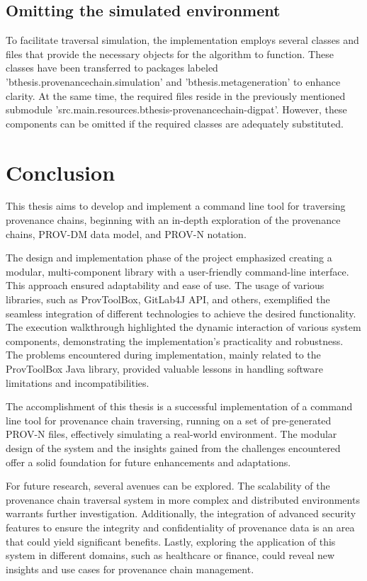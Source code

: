 \documentclass[
  digital,     %
  oneside,     %
  nosansbold,  %
  nocolorbold, %
  lof,         %
  lot,         %
]{fithesis4}
\begin{document}
\section{Omitting the simulated environment}
To facilitate traversal simulation, the implementation employs several classes and files that provide the necessary objects for the algorithm to function. These classes have been transferred to packages labeled 'bthesis.provenancechain.simulation' and 'bthesis.metageneration' to enhance clarity. At the same time, the required files reside in the previously mentioned submodule 'src.main.resources.bthesis-provenancechain-digpat'. However, these components can be omitted if the required classes are adequately substituted.
\shorthandon{-}


\chapter*{Conclusion}
\shorthandoff{-}
This thesis aims to develop and implement a command line tool for traversing provenance chains, beginning with an in-depth exploration of the provenance chains, PROV-DM data model, and PROV-N notation.

The design and implementation phase of the project emphasized creating a modular, multi-component library with a user-friendly command-line interface. This approach ensured adaptability and ease of use. The usage of various libraries, such as ProvToolBox, GitLab4J API, and others, exemplified the seamless integration of different technologies to achieve the desired functionality. The execution walkthrough highlighted the dynamic interaction of various system components, demonstrating the implementation's practicality and robustness. The problems encountered during implementation, mainly related to the ProvToolBox Java library, provided valuable lessons in handling software limitations and incompatibilities.

The accomplishment of this thesis is a successful implementation of a command line tool for provenance chain traversing, running on a set of pre-generated PROV-N files, effectively simulating a real-world environment. The modular design of the system and the insights gained from the challenges encountered offer a solid foundation for future enhancements and adaptations.

For future research, several avenues can be explored. The scalability of the provenance chain traversal system in more complex and distributed environments warrants further investigation. Additionally, the integration of advanced security features to ensure the integrity and confidentiality of provenance data is an area that could yield significant benefits. Lastly, exploring the application of this system in different domains, such as healthcare or finance, could reveal new insights and use cases for provenance chain management.
\shorthandon{-}

\printbibliography[heading=bibintoc]
\end{document}

